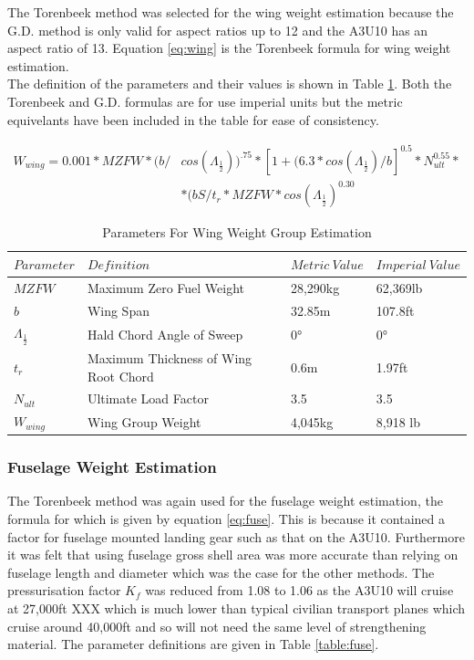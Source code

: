 \documentclass[11pt]{article}
\newcommand{\ra}[1]{\renewcommand{\arraystretch}{#1}}
\begin{document}
The Torenbeek method was selected for the wing weight estimation because the G.D. method is only valid for aspect ratios up to 12 and the A3U10 has an aspect ratio of 13. Equation \ref{eq:wing} is the Torenbeek formula for wing weight estimation.\\
The definition of the parameters and their values is shown in Table \ref{table:wing}. Both the Torenbeek and G.D. formulas are for use imperial units but the metric equivelants have been included in the table for ease of consistency.


\begin{equation} \label{eq:wing} %
\begin{split} 
W_{wing} = 0.001*MZFW*(b /& cos(\Lambda_{\frac{1}{2}}))^{.75}*[ 1 + (6.3*cos(\Lambda_{\frac{1}{2}})/b]^{0.5}*N_{ult}^{0.55}* \\
 & *(bS / t_{r}*MZFW*cos(\Lambda_{\frac{1}{2}})^{0.30}
\end{split}
\end{equation}

\begin{table}\centering    %
\ra{1.3}
\begin{tabular}{@{}llll@{}}\toprule
$Parameter$ & $Definition$ & $Metric \ Value$ & $Imperial \ Value$ \\
\midrule
$MZFW$& Maximum Zero Fuel Weight & 28,290kg & 62,369lb \\
$b$ & Wing Span & 32.85m & 107.8ft \\ 
$\Lambda_{\frac{1}{2}}$ & Hald Chord Angle of Sweep & \ang{0} & \ang{0} \\
$t_{r}$& Maximum Thickness of Wing Root Chord & 0.6m & 1.97ft \\
$N_{ult}$& Ultimate Load Factor & 3.5 & 3.5 \\
\midrule
$W_{wing}$ & Wing Group Weight & 4,045kg & 8,918 lb \\
\bottomrule
\end{tabular}
\caption{Parameters For Wing Weight Group Estimation}
\label{table:wing}
\end{table}
\FloatBarrier

\subsubsection{Fuselage Weight Estimation}

The Torenbeek method was again used for the fuselage weight estimation, the formula for which is given by equation \ref{eq:fuse}. This is because it contained a factor for fuselage mounted landing gear such as that on the A3U10. Furthermore it was felt that using fuselage gross shell area was more accurate than relying on fuselage length and diameter which was the case for the other methods. The pressurisation factor $K_f$ was reduced from 1.08 to 1.06 as the A3U10 will cruise at 27,000ft XXX which is much lower than typical civilian transport planes which cruise around 40,000ft and so will not need the same level of strengthening material. The parameter definitions are given in Table \ref{table:fuse}.
\end{document}
